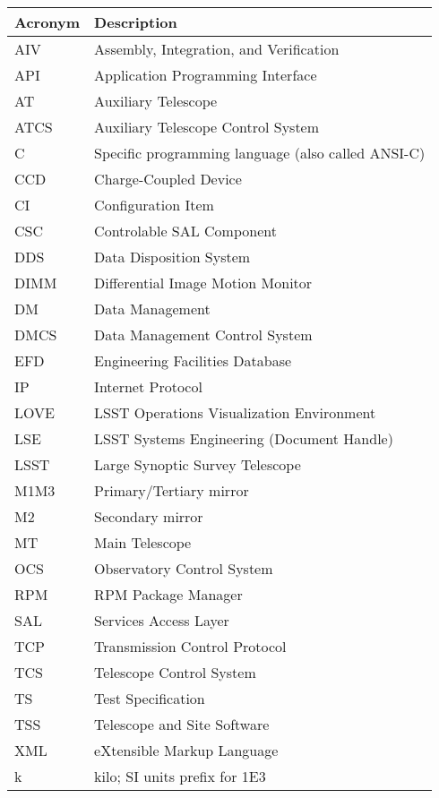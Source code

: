 \addtocounter{table}{-1}
\begin{longtable}{|l|p{}|}\hline
\textbf{Acronym} & \textbf{Description}  \\\hline

AIV & Assembly, Integration, and Verification \\\hline
API & Application Programming Interface \\\hline
AT & Auxiliary Telescope \\\hline
ATCS & Auxiliary Telescope Control System \\\hline
C & Specific programming language (also called ANSI-C) \\\hline
CCD & Charge-Coupled Device \\\hline
CI & Configuration Item \\\hline
CSC & Controlable SAL Component \\\hline
DDS & Data Disposition System \\\hline
DIMM & Differential Image Motion Monitor \\\hline
DM & Data Management \\\hline
DMCS & Data Management Control System \\\hline
EFD & Engineering Facilities Database \\\hline
IP & Internet Protocol \\\hline
LOVE & LSST Operations Visualization Environment \\\hline
LSE & LSST Systems Engineering (Document Handle) \\\hline
LSST & Large Synoptic Survey Telescope \\\hline
M1M3 & Primary/Tertiary mirror \\\hline
M2 & Secondary mirror \\\hline
MT & Main Telescope \\\hline
OCS & Observatory Control System \\\hline
RPM & RPM Package Manager \\\hline
SAL & Services Access Layer \\\hline
TCP & Transmission Control Protocol \\\hline
TCS & Telescope Control System \\\hline
TS & Test Specification \\\hline
TSS & Telescope and Site Software \\\hline
XML & eXtensible Markup Language \\\hline
k & kilo; SI units prefix for 1E3 \\\hline
\end{longtable}
